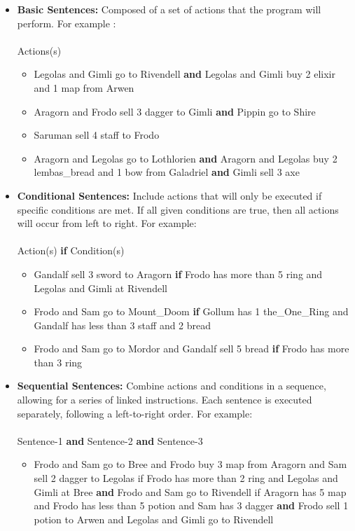 \documentclass[12pt]{article}
\begin{document}
\begin{itemize}
    \item \textbf{Basic Sentences:} Composed of a set of actions that the program will perform. For example : \\\\
    Actions(s)
    \begin{itemize}
        \item Legolas and Gimli go to Rivendell \textbf{and} Legolas and Gimli buy 2 elixir and 1 map from Arwen
\item Aragorn and Frodo sell 3 dagger to Gimli \textbf{and} Pippin go to Shire
\item Saruman sell 4 staff to Frodo
\item Aragorn and Legolas go to Lothlorien \textbf{and} Aragorn and Legolas buy 2 lembas\_bread and 1 bow from Galadriel \textbf{and} Gimli sell 3 axe
    \end{itemize}
    \item \textbf{Conditional Sentences:} Include actions that will only be executed if specific conditions are met. If all given conditions are true, then all actions will occur from left to right. For example: \\\\
    Action(s) \textbf{if} Condition(s) 
    \begin{itemize}
        \item Gandalf sell 3 sword to Aragorn \textbf{if} Frodo has more than 5 ring and Legolas and Gimli at Rivendell
        \item Frodo and Sam go to Mount\_Doom \textbf{if} Gollum has 1 the\_One\_Ring and Gandalf has less than 3 staff and 2 bread
        \item Frodo and Sam go to Mordor and Gandalf sell 5 bread \textbf{if} Frodo has more than 3 ring

    \end{itemize}
    \item \textbf{Sequential Sentences:} Combine actions and conditions in a sequence, allowing for a series of linked instructions. Each sentence is executed separately, following a left-to-right order. For example: \\\\
    Sentence-1 \textbf{and} Sentence-2 \textbf{and} Sentence-3
    \begin{itemize}
        \item \color{blue} Frodo and Sam go to Bree and Frodo buy 3 map from Aragorn and Sam sell 2 dagger to Legolas if Frodo has more than 2 ring and Legolas and Gimli at Bree \color{black} \textbf{and} \color{ForestGreen} Frodo and Sam go to Rivendell if Aragorn has 5 map and Frodo has less than 5 potion and Sam has 3 dagger \color{black} \textbf{and} \color{RedViolet} Frodo sell 1 potion to Arwen and Legolas and Gimli go to Rivendell
    \end{itemize}
\end{itemize}
\end{document}

